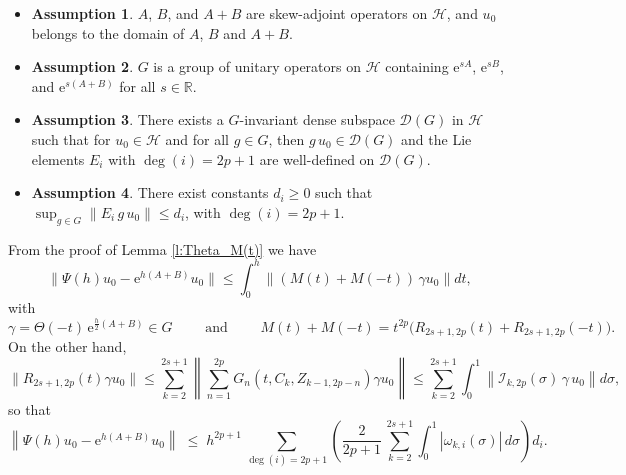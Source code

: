 \documentclass[11pt]{article}
\newcommand{\e}{\ensuremath{\mathrm{e}}}
\begin{document}
\begin{itemize}
  \item \textbf{Assumption 1}. $A$, $B$, and $A+B$ are skew-adjoint operators on $\mathcal{H}$, and $u_0$ belongs
  to the domain of $A$, $B$ and $A+B$.
  \item \textbf{Assumption 2}. $G$ is a group of unitary operators on $\mathcal{H}$ containing $\e^{s A}$, $\e^{s B}$,
and $\e^{s (A+B)}$ for all $s \in \mathbb{R}$.
  \item \textbf{Assumption 3}. There exists a $G$-invariant dense subspace $\mathcal{D}(G)$  in $\mathcal{H}$ such that for $u_0 \in \mathcal{H}$ and for
all $g \in G$, then $g \, u_0 \in \mathcal{D}(G)$ and  the Lie elements $E_i$ with $\deg(i) = 2p+1$ 
are well-defined on $\mathcal{D}(G)$.
  \item \textbf{Assumption 4}. There exist constants $d_{i} \geq 0$ such that  $\sup_{g \in G} \| E_i \, g \, u_0\| \leq d_{i}$, with
  $\deg(i) = 2p+1$. 
\end{itemize}
%
From the proof of Lemma \eqref{l:Theta_M(t)} we have 
\[
  \|\Psi(h) u_0 - \e^{h(A+B)} u_0 \| \le \int_0^h \| (M(t) + M(-t)) \, \gamma u_0\| dt,
\]
with
\[
 \gamma = \Theta(-t) \, \e^{\frac{h}{2}(A+B)} \in G \qquad \mbox{ and } \qquad  
 M(t) + M(-t) =  t^{2p}  \big(R_{2s+1,2p}(t) + R_{2s+1,2p}(-t) \big).
\]
On the other hand,
\[
  \|R_{2s+1,2p}(t) \gamma u_0 \|   \le \sum_{k=2}^{2s+1} \left\| \sum_{n=1}^{2p} G_n(t, C_k, Z_{k-1,2p-n}) \gamma u_0 \right\| 
   \le  \sum_{k=2}^{2s+1} \int_0^1 \left\| \mathcal{I}_{k,2p}(\sigma) \, \gamma \, u_0 \right\| d\sigma,  
\]     
so that 
\begin{equation} \label{local_error_unb}
  \left\|\Psi(h) u_0 - \e^{h(A+B)} u_0 \right\| 
     \;\le\; 
     h^{2p+1}\,  \sum_{\deg(i)=2p+1}
      \left(
      \frac{2}{2p+1}\, 
       \sum_{k=2}^{2s+1} 
        \int_0^1 |\omega_{k,i}(\sigma)|\, d\sigma
      \right) d_i.
\end{equation}
%
\end{document}
